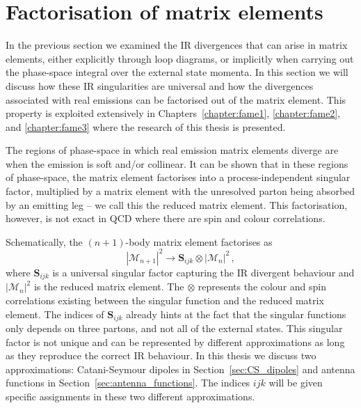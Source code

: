 \documentclass[main.tex]{subfiles}
\begin{document}
\section{Factorisation of matrix elements}\label{sec:me_factorisation}
    In the previous section we examined the IR divergences
    that can arise in matrix elements, either explicitly
    through loop diagrams, or implicitly when carrying
    out the phase-space integral over the external state
    momenta. In this section we will discuss how these IR
    singularities are universal and how the divergences
    associated with real emissions can be factorised out
    of the matrix element. This property is exploited
    extensively in Chapters~\ref{chapter:fame1}, \ref{chapter:fame2},
    and \ref{chapter:fame3}
    where the research of this thesis is presented.

    The regions of phase-space in which real emission
    matrix elements diverge are when the emission is
    soft and/or collinear. It can be shown that in these
    regions of phase-space, the matrix element factorises
    into a process-independent singular factor, multiplied
    by a matrix element with the unresolved parton
    being absorbed by an emitting leg -- we call this the reduced matrix
    element. This factorisation, however, is not exact
    in QCD where there are spin and colour correlations.

    Schematically, the $(n+1)$-body matrix element
    factorises as
    \begin{equation}\label{eqn:me_factorisation}
        |\mathcal{M}_{n+1}|^{2} \rightarrow \bm{S}_{ijk} \otimes |\mathcal{M}_{n}|^{2} \, ,
    \end{equation}
    where $\bm{S}_{ijk}$ is a universal singular factor capturing
    the IR divergent behaviour and $|\mathcal{M}_{n}|^{2}$
    is the reduced matrix element. The $\otimes$
    represents the colour and spin correlations existing
    between the singular function and the reduced matrix element.
    The indices of $\bm{S}_{ijk}$ already hints at the fact
    that the singular functions only depends on three partons,
    and not all of the external states.
    This singular factor is not unique and can be represented by
    different approximations as long as they reproduce the
    correct IR behaviour. In this thesis we discuss
    two approximations: Catani-Seymour dipoles \cite{Catani:1996vz}
    in Section~\ref{sec:CS_dipoles} and antenna functions \cite{Gehrmann-DeRidder:2005btv}
    in Section~\ref{sec:antenna_functions}. The indices $ijk$
    will be given specific assignments in these two different
    approximations.
\end{document}
